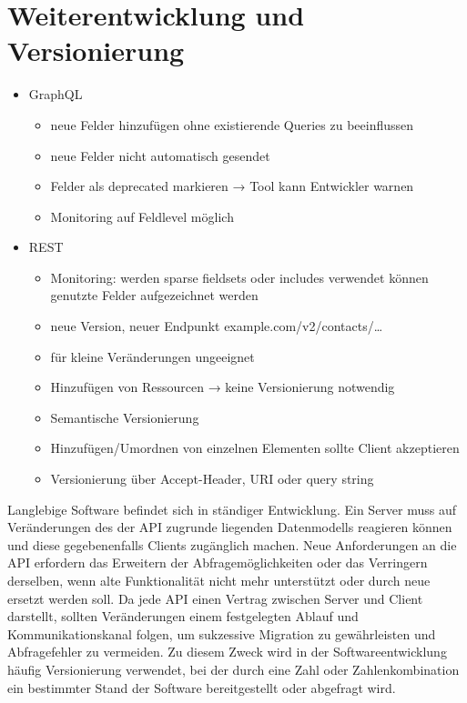 \section{Weiterentwicklung und Versionierung}
\begin{itemize}
  \item GraphQL
  \begin{itemize}
    \item neue Felder hinzufügen ohne existierende Queries zu beeinflussen
    \item neue Felder nicht automatisch gesendet
    \item Felder als deprecated markieren → Tool kann Entwickler warnen
    \item Monitoring auf Feldlevel möglich
  \end{itemize}
  \item REST
  \begin{itemize}
    \item Monitoring: werden sparse fieldsets oder includes verwendet können genutzte Felder aufgezeichnet werden
    \item neue Version, neuer Endpunkt example.com/v2/contacts/\dots
    \item für kleine Veränderungen ungeeignet
    \item Hinzufügen von Ressourcen → keine Versionierung notwendig
    \item Semantische Versionierung
    \item Hinzufügen/Umordnen von einzelnen Elementen sollte Client akzeptieren
    \item Versionierung über Accept-Header, URI oder query string
  \end{itemize}
\end{itemize}
\par 
Langlebige Software befindet sich in ständiger Entwicklung.
Ein Server muss auf Veränderungen des der API zugrunde liegenden Datenmodells reagieren können und diese gegebenenfalls Clients zugänglich machen.
Neue Anforderungen an die API erfordern das Erweitern der Abfragemöglichkeiten oder das Verringern derselben, wenn alte Funktionalität nicht mehr unterstützt oder durch neue ersetzt werden soll.
Da jede API einen Vertrag zwischen Server und Client darstellt, sollten Veränderungen einem festgelegten Ablauf und Kommunikationskanal folgen, um sukzessive Migration zu gewährleisten und Abfragefehler zu vermeiden.
Zu diesem Zweck wird in der Softwareentwicklung häufig Versionierung verwendet, bei der durch eine Zahl oder Zahlenkombination ein bestimmter Stand der Software bereitgestellt oder abgefragt wird.
